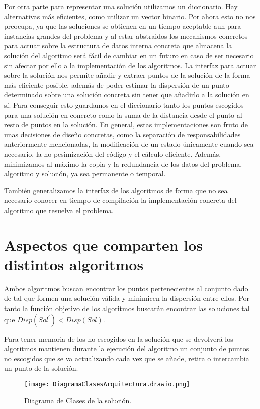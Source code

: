 Por otra parte para representar una solución utilizamos un diccionario. Hay alternativas más eficientes, como utilizar un vector binario. Por ahora
esto no nos preocupa, ya que las soluciones se obtienen en un tiempo aceptable aun para instancias grandes del problema y al estar abstraidos los mecanismos concretos
para actuar sobre la estructura de datos interna concreta que almacena la solución del algoritmo será fácil de cambiar en un futuro en caso de ser necesario sin
afectar por ello a la implementación de los algoritmos. La interfaz para actuar sobre la solución nos permite añadir y extraer puntos de la solución
de la forma más eficiente posible, además de poder estimar la dispersión de un punto determinado sobre una solución concreta sin tener que añadirlo a
la solución en sí. Para conseguir esto guardamos en el diccionario tanto los puntos escogidos para una solución en concreto como la suma de la distancia desde el punto
al resto de puntos en la solución. En general, estas implementaciones son fruto de unas decisiones de diseño concretas, como la separación de responsabilidades anteriormente
mencionadas, la modificación de un estado únicamente cuando sea necesario, la no pesimización del código y el cálculo eficiente. Además, minimizamos al máximo la copia y la redundancia
de los datos del problema, algoritmo y solución, ya sea permanente o temporal.

También generalizamos la interfaz de los algoritmos de forma que no sea necesario conocer en tiempo de compilación la implementación concreta del algoritmo que resuelva el problema.

\section{Aspectos que comparten los distintos algoritmos}

Ambos algoritmos buscan encontrar los puntos pertenecientes al conjunto dado de tal que formen una solución válida y minimicen la dispersión entre ellos. Por tanto la función objetivo de los algoritmos buscarán encontrar las soluciones tal que $ Disp(Sol^{\prime}) < Disp(Sol) $.

Para tener memoria de los no escogidos en la solución que se devolverá los algoritmos mantienen durante la ejecución del algoritmo un conjunto de puntos no escogidos que se va actualizando cada vez que se añade, retira o intercambia un punto de la solución.

\begin{figure}[h]
    \centering
    \texttt{[image: DiagramaClasesArquitectura.drawio.png]}
    \caption{Diagrama de Clases de la solución.}
\end{figure}